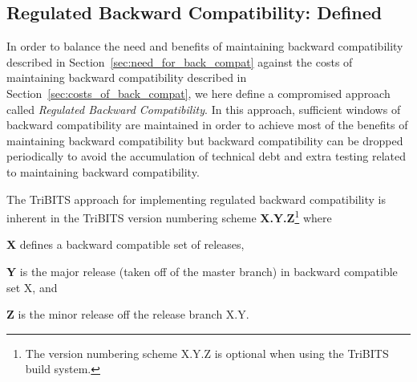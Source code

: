 \documentclass[11pt]{SANDreport}
\begin{document}
%
{}\subsection{Regulated Backward Compatibility: Defined}
\label{sec:defined_reg_back_compat}
%

In order to balance the need and benefits of maintaining backward
compatibility described in Section~\ref{sec:need_for_back_compat}
against the costs of maintaining backward compatibility described in
Section~\ref{sec:costs_of_back_compat}, we here define a compromised
approach called {}\textit{Regulated Backward Compatibility}.  In this
approach, sufficient windows of backward compatibility are maintained
in order to achieve most of the benefits of maintaining backward
compatibility but backward compatibility can be dropped periodically
to avoid the accumulation of technical debt and extra testing related
to maintaining backward compatibility.

The TriBITS approach for implementing regulated backward compatibility
is inherent in the TriBITS version numbering scheme
{}\textbf{X.Y.Z}\footnote{The version numbering scheme X.Y.Z is
optional when using the TriBITS build system.} where
%
\begin{compactitem}
%
{}\item\textbf{X} defines a backward compatible set of releases,
%
{}\item\textbf{Y} is the major release (taken off of the master
branch) in backward compatible set X, and
%
{}\item\textbf{Z} is the minor release off the release branch X.Y.
%
\end{compactitem}

\begin{figure}
\begin{center}
\end{center}
\end{figure}
\end{document}
